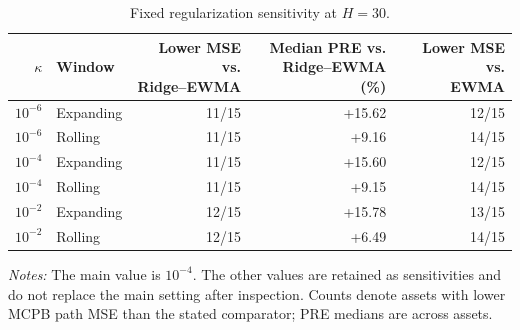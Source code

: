 \begin{table}[tbp]
\centering\small
\setlength{\tabcolsep}{4pt}
\renewcommand{\arraystretch}{1.12}
\caption{Fixed regularization sensitivity at $H=30$.}
\label{tab:regularization}
\begin{tabular}{rlrrr}
\toprule
$\kappa$ & Window & \shortstack{Lower MSE vs.\\Ridge--EWMA} & \shortstack{Median PRE vs.\\Ridge--EWMA (\%)} & \shortstack{Lower MSE vs.\\EWMA} \\
\midrule
$10^{-6}$ & Expanding & 11/15 & +15.62 & 12/15 \\
$10^{-6}$ & Rolling & 11/15 & +9.16 & 14/15 \\
$10^{-4}$ & Expanding & 11/15 & +15.60 & 12/15 \\
$10^{-4}$ & Rolling & 11/15 & +9.15 & 14/15 \\
$10^{-2}$ & Expanding & 12/15 & +15.78 & 13/15 \\
$10^{-2}$ & Rolling & 12/15 & +6.49 & 14/15 \\
\bottomrule
\end{tabular}
\par\smallskip
\begin{minipage}{0.98\linewidth}\footnotesize
\textit{Notes:} The main value is $10^{-4}$. The other values are retained as sensitivities and do not replace the main setting after inspection. Counts denote assets with lower MCPB path MSE than the stated comparator; PRE medians are across assets.
\end{minipage}
\end{table}
